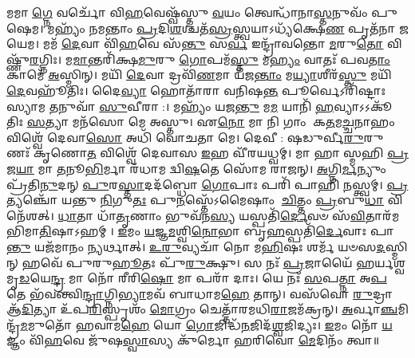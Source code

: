 𑌮𑌮𑌾\-\ul{𑌗𑍍𑌨𑍇} 𑌵𑌰𑍍𑌚𑍋᳴ 𑌵𑌿\-\ul{𑌹}\-𑌵𑍇𑌷𑍍𑌵᳴𑌸𑍍𑌤𑍁 \ul{𑌵}\-𑌯𑌂 𑌤𑍍𑌵𑍇𑌨𑍍𑌧𑌾᳴𑌨𑌾\-\ul{𑌸𑍍𑌤}\-𑌨𑍁𑌵𑌂᳴ 𑌪𑍁𑌷𑍇𑌮। 𑌮𑌹𑍍𑌯𑌂᳴ 𑌨𑌮𑌨𑍍𑌤𑌾𑌂 \ul{𑌪𑍍𑌰}\-𑌦𑌿\-\ul{𑌶}\-𑌶𑍍𑌚𑌤᳴\-\ul{𑌸𑍍𑌰}\-𑌸𑍍𑌤𑍍𑌵𑌯𑌾𑌽𑌧𑍍𑌯᳴𑌕𑍍𑌷𑍇\-\ul{𑌣} 𑌪𑍃𑌤᳴𑌨𑌾 𑌜𑌯𑍇𑌮। 𑌮𑌮᳴ \ul{𑌦𑍇}\-𑌵𑌾 𑌵𑌿᳴\-\ul{𑌹}\-𑌵𑍇 𑌸᳴\-\ul{𑌨𑍍𑌤𑍁} 𑌸\-\ul{𑌰𑍍𑌵} 𑌇𑌨𑍍𑌦𑍍𑌰𑌾᳴𑌵𑌨𑍍𑌤𑍋 \ul{𑌮}\-𑌰𑍁\-\ul{𑌤𑍋} 𑌵𑌿𑌷𑍍𑌣𑍁᳴\-\ul{𑌰}\-𑌗𑍍𑌨𑌿𑌃। 𑌮\-\ul{𑌮𑌾}\-𑌨𑍍𑌤𑌰𑌿᳴𑌕𑍍𑌷\-\ul{𑌮𑍁}\-𑌰𑍁 \ul{𑌗𑍋}\-𑌪𑌮᳴\-\ul{𑌸𑍍𑌤𑍁} 𑌮\-\ul{𑌹𑍍𑌯𑌂} 𑌵𑌾𑌤𑌃᳴ 𑌪𑌵\-\ul{𑌤𑌾𑌂} 𑌕𑌾𑌮𑍇᳴ \ul{𑌅}\-𑌸𑍍𑌮𑌿𑌨𑍍। 𑌮𑌯𑌿᳴ \ul{𑌦𑍇}\-𑌵𑌾 𑌦𑍍𑌰𑌵𑌿᳴\-\ul{𑌣}\-𑌮𑌾 𑌯᳴𑌜\-\ul{𑌨𑍍𑌤𑌾𑌂} 𑌮\-\ul{𑌯𑍍𑌯𑌾}\-𑌶𑍀𑌰᳴\-\ul{𑌸𑍍𑌤𑍁} 𑌮𑌯𑌿᳴ \ul{𑌦𑍇}\-𑌵𑌹𑍂᳴𑌤𑌿𑌃। 𑌦𑍈\-\ul{𑌵𑍍𑌯𑌾} 𑌹𑍋𑌤𑌾᳴𑌰𑌾 𑌵𑌨𑌿𑌷\-\ul{𑌨𑍍𑌤} 𑌪𑍂𑌰𑍍𑌵𑍇𑌽𑌰𑌿᳴𑌷𑍍𑌟𑌾𑌃 𑌸𑍍𑌯𑌾𑌮 \ul{𑌤}\-𑌨𑍁𑌵𑌾᳴ \ul{𑌸𑍁}\-𑌵𑍀𑌰𑌾:। 𑌮𑌹𑍍𑌯𑌂᳴ 𑌯𑌜\-\ul{𑌨𑍍𑌤𑍁} 𑌮\-\ul{𑌮} 𑌯𑌾𑌨𑌿᳴ \ul{𑌹}\-𑌵𑍍𑌯𑌾𑌽𑌽𑌕𑍂᳴𑌤𑌿𑌃 \ul{𑌸}\-𑌤𑍍𑌯𑌾 𑌮𑌨᳴𑌸𑍋 𑌮𑍇 𑌅𑌸𑍍𑌤𑍁। 𑌏\-\ul{𑌨𑍋} 𑌮𑌾 𑌨𑌿 𑌗𑌾𑌂 𑌕\-\ul{𑌤}\-𑌮\-\ul{𑌚𑍍𑌚}\-𑌨𑌾𑌹𑌂 𑌵𑌿𑌶𑍍𑌵𑍇᳴ 𑌦𑍇𑌵𑌾\-\ul{𑌸𑍋} 𑌅𑌧𑌿᳴ 𑌵𑍋𑌚𑌤𑌾 𑌮𑍇। 𑌦𑍇𑌵𑍀: 𑌷𑌡𑍁𑌰𑍍𑌵𑍀\-\ul{𑌰𑍁}\-𑌰𑍁 𑌣𑌃᳴ 𑌕𑍃𑌣𑍋\-\ul{𑌤} 𑌵𑌿𑌶𑍍𑌵𑍇᳴ 𑌦𑍇𑌵𑌾𑌸 \ul{𑌇}\-𑌹 𑌵𑍀᳴𑌰𑌯𑌧𑍍𑌵𑌮𑍍। 𑌮𑌾 𑌹𑌾𑌸𑍍𑌮𑌹𑌿 \ul{𑌪𑍍𑌰}\-𑌜\-\ul{𑌯𑌾} 𑌮𑌾 \ul{𑌤}\-𑌨𑍂\-\ul{𑌭𑌿}\-𑌰𑍍𑌮𑌾 𑌰᳴𑌧𑌾𑌮 𑌦𑍍𑌵𑌿\-\ul{𑌷}\-𑌤𑍇 𑌸𑍋᳴𑌮 𑌰𑌾𑌜𑌨𑍍। \ul{𑌅}\-𑌗𑍍𑌨𑌿\-\ul{𑌰𑍍𑌮}\-𑌨𑍍𑌯𑍁𑌂 𑌪𑍍𑌰᳴𑌤𑌿\-\ul{𑌨𑍁}\-𑌦𑌨𑍍 \ul{𑌪𑍁}\-𑌰\-\ul{𑌸𑍍𑌤𑌾}\-𑌦𑌦᳴𑌬𑍍𑌧𑍋 \ul{𑌗𑍋}\-𑌪𑌾𑌃 𑌪𑌰𑌿᳴ 𑌪𑌾𑌹𑌿 \ul{𑌨}\-𑌸𑍍𑌤𑍍𑌵𑌮𑍍। \ul{𑌪𑍍𑌰}\-𑌤𑍍𑌯𑌞𑍍𑌚𑍋᳴ 𑌯𑌨𑍍𑌤𑍁 \ul{𑌨𑌿}\-𑌗𑍁\-\ul{𑌤𑌃} 𑌪𑍁\-\ul{𑌨}\-𑌸𑍍𑌤𑍇᳴𑌽𑌮𑍈𑌷𑌾𑌂 \ul{𑌚𑌿}\-𑌤𑍍𑌤𑌂 \ul{𑌪𑍍𑌰}\-𑌬𑍁\-\ul{𑌧𑌾} 𑌵𑌿 𑌨𑍇᳴𑌶𑌤𑍍। \ul{𑌧𑌾}\-𑌤𑌾 𑌧𑌾᳴\-\ul{𑌤𑍃}\-𑌣𑌾𑌂 𑌭𑍁𑌵᳴𑌨\-\ul{𑌸𑍍𑌯} 𑌯𑌸𑍍𑌪𑌤𑌿᳴\-\ul{𑌰𑍍𑌦𑍇}\-𑌵𑍞 𑌸᳴\-\ul{𑌵𑌿}\-𑌤𑌾𑌰᳴𑌮𑌭𑌿𑌮𑌾\-\ul{𑌤𑌿}\-𑌷𑌾𑌽𑌹𑌮𑍍। \ul{𑌇}\-𑌮𑌂 \ul{𑌯}\-𑌜𑍍𑌞\-\ul{𑌮}\-𑌶𑍍𑌵𑌿\-\ul{𑌨𑍋}\-𑌭𑌾 𑌬𑍃\-\ul{𑌹}\-𑌸𑍍𑌪𑌤𑌿᳴\-\ul{𑌰𑍍𑌦𑍇}\-𑌵𑌾𑌃 𑌪𑌾\-\ul{𑌨𑍍𑌤𑍁} 𑌯𑌜᳴𑌮𑌾𑌨𑌂 \ul{𑌨𑍍𑌯}\-𑌰𑍍𑌥𑌾𑌤𑍍। \ul{𑌉}\-\-\ul{𑌰𑍁}\-𑌵𑍍𑌯𑌚𑌾᳴ 𑌨𑍋 𑌮\-\ul{𑌹𑌿}\-𑌷𑌃 𑌶𑌰𑍍𑌮᳴ 𑌯𑍞𑌸\-\ul{𑌦}\-𑌸𑍍𑌮𑌿𑌨𑍍 𑌹𑌵𑍇᳴ 𑌪𑍁𑌰𑍁\-\ul{𑌹𑍂}\-𑌤𑌃 𑌪𑍁᳴\-\ul{𑌰𑍁}\-𑌕𑍍𑌷𑍁। 𑌸 𑌨𑌃᳴ \ul{𑌪𑍍𑌰}\-𑌜𑌾𑌯𑍈᳴ 𑌹𑌰𑍍𑌯𑌶𑍍𑌵 𑌮𑍃\-\ul{𑌡}\-𑌯𑍇\-\ul{𑌨𑍍𑌦𑍍𑌰} 𑌮𑌾 𑌨𑍋᳴ 𑌰𑍀𑌰𑌿\-\ul{𑌷𑍋} 𑌮𑌾 𑌪𑌰𑌾᳴ 𑌦𑌾𑌃। 𑌯𑍇 𑌨𑌃᳴ \ul{𑌸}\-𑌪\-\ul{𑌤𑍍𑌨𑌾} 𑌅\-\ul{𑌪} 𑌤𑍇 𑌭᳴𑌵𑌨𑍍𑌤𑍍𑌵𑌿\-\ul{𑌨𑍍𑌦𑍍𑌰𑌾}\-𑌗𑍍𑌨𑌿\-\ul{𑌭𑍍𑌯𑌾}\-𑌮𑌵᳴ 𑌬𑌾𑌧𑌾𑌮\-\ul{𑌹𑍇} 𑌤𑌾𑌨𑍍। 𑌵𑌸᳴𑌵𑍋 \ul{𑌰𑍁}\-𑌦𑍍𑌰𑌾 𑌆᳴\-\ul{𑌦𑌿}\-𑌤𑍍𑌯𑌾 𑌉᳴𑌪\-\ul{𑌰𑌿}\-𑌸𑍍𑌪𑍃𑌶𑌂᳴ \ul{𑌮𑍋}\-𑌗𑍍𑌰𑌂 𑌚𑍇𑌤𑍍𑌤𑌾᳴𑌰𑌮𑌧𑌿\-\ul{𑌰𑌾}\-𑌜𑌮᳴𑌕𑍍𑌰𑌨𑍍। \ul{𑌅}\-𑌰𑍍𑌵𑌾\-\ul{𑌞𑍍𑌚}\-𑌮𑌿𑌨𑍍𑌦𑍍𑌰᳴\-\ul{𑌮}\-𑌮𑍁𑌤𑍋᳴ 𑌹𑌵𑌾𑌮\-\ul{𑌹𑍇} 𑌯𑍋 \ul{𑌗𑍋}\-𑌜𑌿𑌦𑍍𑌧᳴\-\ul{𑌨}\-𑌜𑌿𑌦᳴\-\ul{𑌶𑍍𑌵}\-𑌜𑌿𑌦𑍍𑌯𑌃। \ul{𑌇}\-𑌮𑌂 𑌨𑍋᳴ \ul{𑌯}\-𑌜𑍍𑌞𑌂 𑌵𑌿᳴\-\ul{𑌹}\-𑌵𑍇 𑌜𑍁᳴𑌷\-\ul{𑌸𑍍𑌵𑌾}\-𑌸𑍍𑌯 𑌕𑍁᳴𑌰𑍍𑌮𑍋 𑌹𑌰𑌿𑌵𑍋 \ul{𑌮𑍇}\-𑌦𑌿𑌨𑌂᳴ 𑌤𑍍𑌵𑌾॥

